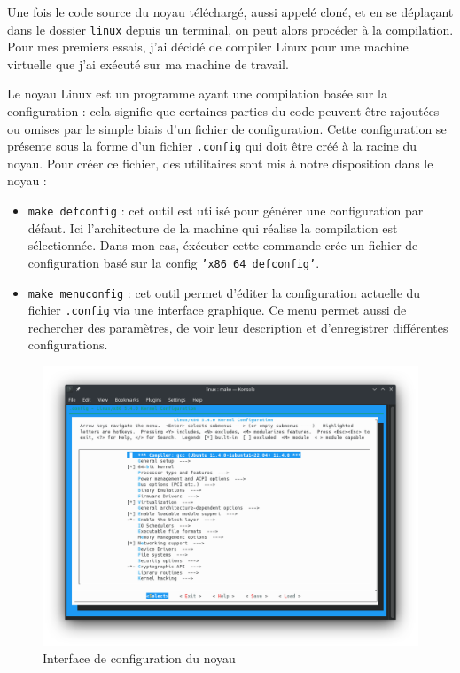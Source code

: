 Une fois le code source du noyau téléchargé, aussi appelé cloné, et en se déplaçant dans le dossier \texttt{linux} depuis un terminal, on peut alors procéder à la compilation. Pour mes premiers essais, j'ai décidé de compiler Linux pour une machine virtuelle que j'ai exécuté sur ma machine de travail.

Le noyau Linux est un programme ayant une compilation basée sur la configuration : cela signifie que certaines parties du code peuvent être rajoutées ou omises par le simple biais d'un fichier de configuration. Cette configuration se présente sous la forme d'un fichier \texttt{.config} qui doit être créé à la racine du noyau. Pour créer ce fichier, des utilitaires sont mis à notre disposition dans le noyau :
\begin{itemize}
    \item \texttt{make defconfig} : cet outil est utilisé pour générer une configuration par défaut. Ici l'architecture de la machine qui réalise la compilation est sélectionnée. Dans mon cas, éxécuter cette commande crée un fichier de configuration basé sur la config \texttt{'x86\_64\_defconfig'}.
    \item \texttt{make menuconfig} : cet outil permet d'éditer la configuration actuelle du fichier \texttt{.config} via une interface graphique. Ce menu permet aussi de rechercher des paramètres, de voir leur description et d'enregistrer différentes configurations.
\end{itemize}

\begin{figure}[H]
    \centering
    \includegraphics[width=0.65\paperwidth]{Images/make menuconfig.png}
    \caption{Interface de configuration du noyau}
\end{figure}


